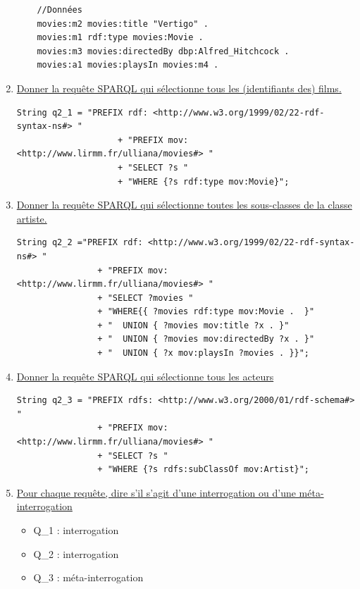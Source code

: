 \documentclass[12pt,a4paper]{article}
\begin{document}
\begin{justify}
\begin{enumerate}
\begin{verbatim}
    //Données
    movies:m2 movies:title "Vertigo" .
    movies:m1 rdf:type movies:Movie .
    movies:m3 movies:directedBy dbp:Alfred_Hitchcock .
    movies:a1 movies:playsIn movies:m4 .
            \end{verbatim}
            \item \underline{Donner la requ\^ete SPARQL qui s\'electionne tous les (identifiants des) films.} \\
            \begin{verbatim}
String q2_1 = "PREFIX rdf: <http://www.w3.org/1999/02/22-rdf-syntax-ns#> "
                    + "PREFIX mov: <http://www.lirmm.fr/ulliana/movies#> "
                    + "SELECT ?s "
                    + "WHERE {?s rdf:type mov:Movie}";
            \end{verbatim}
            \item \underline{Donner la requ\^ete SPARQL qui s\'electionne toutes les sous-classes de la classe artiste.}\\
            \begin{verbatim}
String q2_2 ="PREFIX rdf: <http://www.w3.org/1999/02/22-rdf-syntax-ns#> "
                + "PREFIX mov: <http://www.lirmm.fr/ulliana/movies#> "
                + "SELECT ?movies "
                + "WHERE{{ ?movies rdf:type mov:Movie .  }"
                + "  UNION { ?movies mov:title ?x . }"
                + "  UNION { ?movies mov:directedBy ?x . }"
                + "  UNION { ?x mov:playsIn ?movies . }}";
            \end{verbatim}
            \item \underline{Donner la requ\^ete SPARQL qui s\'electionne tous les acteurs}
            \begin{verbatim}
String q2_3 = "PREFIX rdfs: <http://www.w3.org/2000/01/rdf-schema#> "
                + "PREFIX mov: <http://www.lirmm.fr/ulliana/movies#> "
                + "SELECT ?s "
                + "WHERE {?s rdfs:subClassOf mov:Artist}";
            \end{verbatim}
            \item \underline{Pour chaque requ\^ete, dire s\rq{il} s\rq{agit} d\rq{une} interrogation ou d\rq{une} m\'eta-interrogation}
            \begin{itemize}
                \item Q\_1 : interrogation
                \item Q\_2 : interrogation
                \item Q\_3 : m\'eta-interrogation
            \end{itemize}
        \end{enumerate}
    \end{justify}
\end{document}
